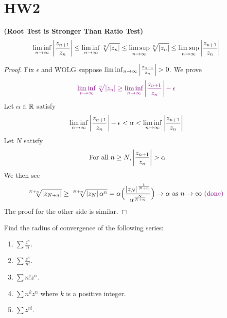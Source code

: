 \documentclass{report}
\begin{document}
\section{HW2}
\begin{theorem}
\label{Root Test is Stronger Than Ratio Test}
\textbf{(Root Test is Stronger Than Ratio Test)}
\begin{align*}
\liminf_{n\to\infty} \left|\frac{z_{n+1}}{z_n}\right|\leq \liminf_{n\to\infty} \sqrt[n]{\left|z_n\right|} \leq \limsup_{n\to\infty} \sqrt[n]{\left|z_n\right|} \leq \limsup_{n\to\infty} \left|\frac{z_{n+1}}{z_n}\right|
\end{align*}
\end{theorem}
\begin{proof}
Fix $\epsilon $ and WOLG suppose $\liminf_{n\to\infty} \abso{\frac{z_{n+1}}{z_n}}>0$. We prove 
\begin{align*}
  \textcolor{violet}{\liminf_{n\to\infty} \sqrt[n]{\left|z_n\right|}\geq \liminf_{n\to\infty} \left|\frac{z_{n+1}}{z_n}\right|-\epsilon  }
\end{align*}
Let $\alpha \in\mathbb{R} $ satisfy 
\begin{align*}
\liminf_{n\to\infty}  \left|\frac{z_{n+1}}{z_n}\right|-\epsilon <\alpha < \liminf_{n\to\infty} \left|\frac{z_{n+1}}{z_n}\right|
\end{align*}
Let $N$ satisfy  
\begin{align*}
\text{ For all }n\geq N,\abso{\frac{z_{n+1}}{z_n}}>\alpha  
\end{align*}
We then see 
\begin{align*}
  \sqrt[N+n]{\left|z_{N+n}\right|}\geq \sqrt[N+n]{\left|z_N\right|\alpha^n}=\alpha \Big(\frac{\left|z_N\right|^{\frac{1}{N+n}}}{\alpha ^{\frac{N}{N+n}}} \Big)\to \alpha \text{ as }n\to \infty \textcolor{violet}{\text{ (done) }}
\end{align*}
The proof for the other side is similar.
\end{proof}
\begin{question}{}{}
Find the radius of convergence of the following series:
\begin{enumerate}[label=(\alph*)]
  \item $\sum \frac{z^n}{n}$.
  \item $\sum \frac{z^n}{n!}$.
  \item $\sum n!z^n$.
  \item $\sum n^kz^n$ where $k$ is a positive integer. 
  \item $\sum z^{n!}$. 
\end{enumerate}
\end{question}
\end{document}

